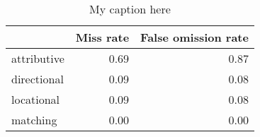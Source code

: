 \begin{table}[!ht]
\centering
\begin{tabular}{lrr}
\toprule
{} &  Miss rate &  False omission rate \\
\midrule
attributive &       0.69 &                 0.87 \\
directional &       0.09 &                 0.08 \\
locational  &       0.09 &                 0.08 \\
matching    &       0.00 &                 0.00 \\
\bottomrule
\end{tabular}
\caption{My caption here}
\label{tab:RELATIONAL-oe-combined-errors}
\end{table}